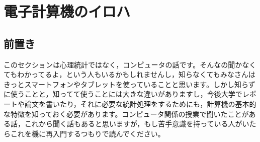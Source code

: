 \documentclass{ltjsbook}
\begin{document}
 
\chapter{電子計算機のイロハ} 
\label{chapter2} 

\section{前置き}
このセクションは心理統計ではなく，コンピュータの話です。そんなの聞かなくてもわかってるよ，という人もいるかもしれませんし，知らなくてもみなさんはきっとスマートフォンやタブレットを使っていることと思います。しかし知らずに使うことと，知ってて使うことには大きな違いがありますし，今後大学でレポートや論文を書いたり，それに必要な統計処理をするためにも，計算機の基本的な特徴を知っておく必要があります。コンピュータ関係の授業で聞いたことがある話，これから聞く話もあると思いますが，もし苦手意識を持っている人がいたらこれを機に再入門するつもりで読んでください。
\end{document}
